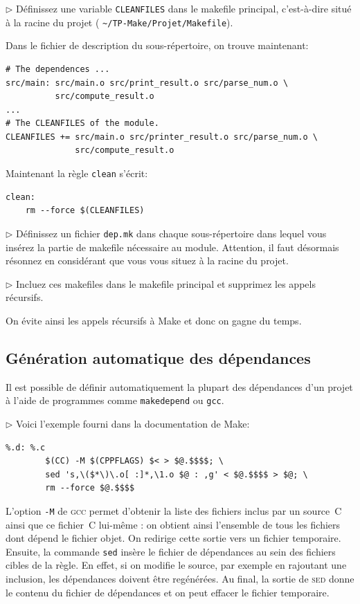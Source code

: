 \documentclass[11pt,a4paper]{article}
\newcommand{\must}{\noindent $\triangleright$ \xspace}
\begin{document}
\must Définissez une variable \texttt{\small CLEANFILES} dans le
makefile principal, c'est-à-dire situé à la racine du projet ({\small
\verb!~/TP-Make/Projet/Makefile!}).

\medskip

\noindent Dans le fichier de description du sous-répertoire, on trouve
maintenant:
{\small
\begin{verbatim}
# The dependences ...
src/main: src/main.o src/print_result.o src/parse_num.o \
          src/compute_result.o
...
# The CLEANFILES of the module.
CLEANFILES += src/main.o src/printer_result.o src/parse_num.o \
              src/compute_result.o
\end{verbatim}
}
\noindent Maintenant la règle \texttt{clean} s'écrit:
{\small
\begin{verbatim}
clean:
    rm --force $(CLEANFILES)
\end{verbatim}
}

\must Définissez un fichier \texttt{dep.mk} dans chaque
sous-répertoire dans lequel vous insérez la partie de makefile
nécessaire au module. Attention, il faut désormais résonnez en
considérant que vous vous situez à la racine du projet.

\medskip

\must Incluez ces makefiles dans le makefile principal et supprimez
les appels récursifs.

\medskip

\noindent On évite ainsi les appels récursifs à \textsf{Make} et donc
on gagne du temps.

\subsection{Génération automatique des dépendances}

Il est possible de définir automatiquement la plupart des dépendances
d'un projet à l'aide de programmes comme \verb!makedepend! ou
\verb!gcc!.

\medskip

\must Voici l'exemple fourni dans la documentation de \textsf{Make}:
{\small
\begin{verbatim}
%.d: %.c
        $(CC) -M $(CPPFLAGS) $< > $@.$$$$; \
        sed 's,\($*\)\.o[ :]*,\1.o $@ : ,g' < $@.$$$$ > $@; \
        rm --force $@.$$$$
\end{verbatim}
}

\noindent L'option \texttt{-M} de \textsc{gcc} permet d'obtenir la
liste des fichiers inclus par un source~C ainsi que ce fichier~C
lui-même : on obtient ainsi l'ensemble de tous les fichiers dont
dépend le fichier objet. On redirige cette sortie vers un fichier
temporaire. Ensuite, la commande \texttt{sed} insère le fichier de
dépendances au sein des fichiers cibles de la règle. En effet, si on
modifie le source, par exemple en rajoutant une inclusion, les
dépendances doivent être regénérées. Au final, la sortie de
\textsc{sed} donne le contenu du fichier de dépendances et on peut
effacer le fichier temporaire.
\end{document}
